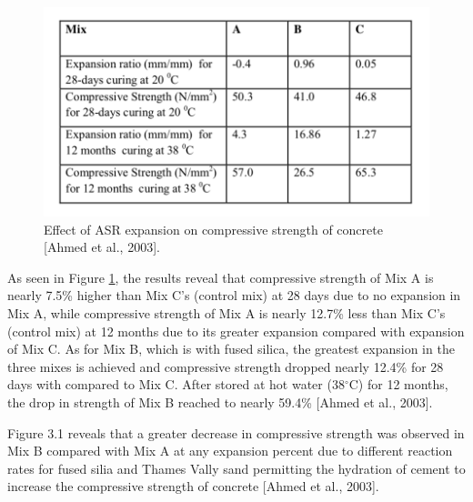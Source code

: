 
\begin{figure}[h!]
  \centering
  \includegraphics[width=0.8\linewidth]{Reference/temp1.png}
  \caption{Effect of ASR expansion on compressive strength of concrete [Ahmed et al., 2003].}
  \label{Ahmed et al., 2003 1}
\end{figure}

As seen in Figure \ref{Ahmed et al., 2003 1}, the results reveal that compressive strength of Mix A is nearly 7.5\% higher than Mix C's (control mix) at 28 days due to no expansion in Mix A, while compressive strength of Mix A is nearly 12.7\% less than Mix C's (control mix) at 12 months due to its greater expansion compared with expansion of Mix C. As for Mix B, which is with fused silica, the greatest expansion in the three mixes is achieved and compressive strength dropped nearly 12.4\% for 28 days with compared to Mix C. After stored at hot water (38$^\circ$C) for 12 months, the drop in strength of Mix B reached to nearly 59.4\% [Ahmed et al., 2003].


Figure 3.1 reveals that a greater decrease in compressive strength was observed in Mix B compared with Mix A at any expansion percent due to different reaction rates for fused silia and Thames Vally sand permitting the hydration of cement to increase the compressive strength of concrete [Ahmed et al., 2003].

